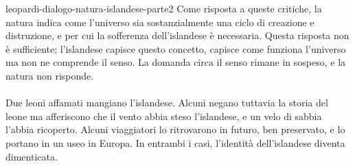\documentclass[preview]{standalone}
\begin{document}
\begin{snippet}{leopardi-dialogo-natura-islandese-parte2}
    Come risposta a queste critiche, la natura indica come l'universo sia sostanzialmente
    una ciclo di creazione e distruzione, e per cui la sofferenza dell'islandese
    è necessaria. Questa risposta non è sufficiente; l'islandese capisce questo concetto,
    capisce come funziona l'universo ma non ne comprende il senso.
    La domanda circa il senso rimane in sospeso, e la natura non risponde.
    \\\\
    Due leoni affamati mangiano l'islandese.
    Alcuni negano tuttavia la storia del leone ma afferiscono che il vento abbia steso l'islandese,
    e un velo di sabbia l'abbia ricoperto. Alcuni viaggiatori lo ritrovarono in futuro, ben
    preservato, e lo portano in un useo in Europa.
    In entrambi i casi, l'identità dell'islandese diventa dimenticata.
\end{snippet}
\end{document}
